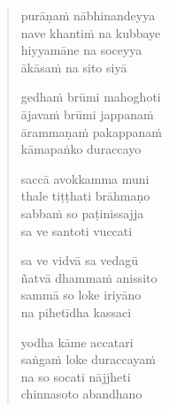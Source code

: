 \clearpage
\begin{verse}

purāṇaṁ nābhinandeyya\\
nave khantiṁ na kubbaye\\
hiyyamāne na soceyya\\
ākāsaṁ na sito siyā

gedhaṁ brūmi mahoghoti\\
ājavaṁ brūmi jappanaṁ\\
ārammaṇaṁ pakappanaṁ\\
kāmapaṅko duraccayo

saccā avokkamma muni\\
thale tiṭṭhati brāhmaṇo\\
sabbaṁ so paṭinissajja\\
sa ve santoti vuccati

sa ve vidvā sa vedagū\\
ñatvā dhammaṁ anissito\\
sammā so loke iriyāno\\
na pihetīdha kassaci

yodha kāme accatari\\
saṅgaṁ loke duraccayaṁ\\
na so socati nājjheti\\
chinnasoto abandhano

\end{verse}


